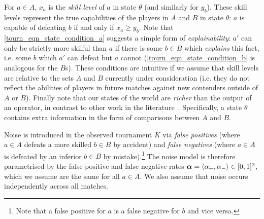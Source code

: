 For $a \in A$, $x_a$ is the \emph{skill level} of $a$ in state $\theta$ (and
similarly for $y_b$). These skill levels represent the true capabilities of the
players in $A$ and $B$ in state $\theta$: $a$ is capable of defeating $b$ if
and only if $x_a \ge y_b$.
%
Note that \cref{tourn_eqn_state_condition_a} suggests a simple form of
\emph{explainability}: $a'$ can only be strictly more skilful than $a$ if there
is some $b \in B$ which \emph{explains} this fact, i.e. some $b$ which $a'$ can
defeat but $a$ cannot (\cref{tourn_eqn_state_condition_b} is analogous for the
$B$s). These conditions are intuitive if we assume that skill levels are
relative to the sets $A$ and $B$ currently under consideration (i.e.
they do not reflect the abilities of players in future matches against new
contenders outside of $A$ or $B$). Finally note that our states of the world
are \emph{richer} than the output of an operator, in contrast to other work in
the literature~\cite{bradley_terry_52, gonzalez2014paired,
elkind2016rationalizations}. Specifically, a state $\theta$ contains extra
information in the form of comparisons between $A$ and $B$.

Noise is introduced in the observed tournament $K$ via \emph{false positives}
(where $a \in A$ defeats a more skilled $b \in B$ by accident) and \emph{false
negatives} (where $a \in A$ is defeated by an inferior $b \in B$ by
mistake).\footnote{Note that a false positive for $a$ is a false negative for
$b$ and vice versa.} The noise model is therefore parametrised by the false
positive and false negative rates $\bm{\alpha} = \langle {\alpha_+, \alpha_-} \rangle
\in [0,1]^2$, which we assume are the same for all $a \in A$.\footnotemark{} We
also assume that noise occurs independently across all matches.

\footnotetext{
    This is a strong assumption, and it may be more realistic to model the
    false positive/negative rates as a function of $x_a$. We leave this to
    future work.
}

